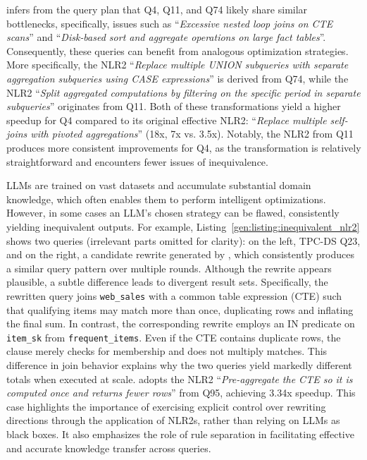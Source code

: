 \noindent\genrewrite infers from the query plan that Q4, Q11, and Q74 likely share similar bottlenecks, specifically, issues such as ``\textit{Excessive nested loop joins on CTE scans}'' and ``\textit{Disk‐based sort and aggregate operations on large fact tables}''. Consequently, these queries can benefit from analogous optimization strategies. More specifically, the NLR2 ``\textit{Replace multiple UNION subqueries with separate aggregation subqueries using CASE expressions}'' is derived from Q74, while 
the NLR2 ``\textit{Split aggregated computations by filtering on the specific period in separate subqueries}'' originates from Q11. Both of these transformations yield a higher speedup for Q4 compared to its original effective NLR2: ``\textit{Replace multiple self-joins with pivoted aggregations}'' (18x, 7x vs. 3.5x). Notably, the NLR2 from Q11 produces more consistent improvements for Q4, as the transformation is relatively straightforward and encounters fewer issues of inequivalence.





\noindent LLMs are trained on vast datasets and accumulate substantial domain knowledge, which often enables them to perform intelligent optimizations. However, in some cases an LLM’s chosen strategy can be flawed, consistently yielding inequivalent outputs. For example, Listing~\ref{gen:listing:inequivalent_nlr2} shows two queries (irrelevant parts omitted for clarity): on the left, TPC-DS Q23, and on the right, a candidate rewrite generated by \baseline, which consistently produces a similar query pattern over multiple rounds. Although the rewrite appears plausible, a subtle difference leads to divergent result sets. Specifically, the rewritten query joins \texttt{web\_sales} with a common table expression (CTE) such that qualifying items may match more than once, duplicating rows and inflating the final sum. In contrast, the corresponding \genrewrite rewrite employs an IN predicate on \texttt{item\_sk} from \texttt{frequent\_items}. Even if the CTE contains duplicate rows, the \sqlin clause merely checks for membership and does not multiply matches. This difference in join behavior explains why the two queries yield markedly different totals when executed at scale. \genrewrite adopts the NLR2 ``\textit{Pre-aggregate the  CTE  so it is computed once and returns fewer rows}'' from Q95, achieving 3.34x speedup. This case highlights the importance of exercising explicit control over rewriting directions through the application of NLR2s, rather than relying on LLMs as black boxes. It also emphasizes the role of rule separation in facilitating effective and accurate knowledge transfer across queries.


